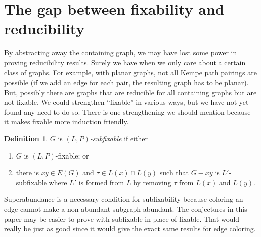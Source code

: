 \documentclass[12pt]{article}
\theoremstyle{plain}
\theoremstyle{definition}
\newtheorem{defn}{Definition}
\theoremstyle{remark}
\begin{document}

%
\section{The gap between fixability and reducibility}
By abstracting away the containing graph, we may have lost some power in proving reducibility results. Surely we have when we only care about a certain class of graphs. For example, with planar graphs, not all Kempe path pairings are possible (if we add an edge for each pair, the resulting graph has to be planar).  But, possibly there are graphs that are reducible for all containing graphs but are not fixable.  We could strengthen ``fixable'' in various ways, but we have not yet found any need to do so.  There is one strengthening we should mention because it makes fixable more induction friendly.  

\begin{defn}
$G$ is \emph{$(L, P)$-subfixable} if either
\begin{enumerate}
\item[(1)] $G$ is $(L, P)$-fixable; or
\item[(2)] there is $xy \in E(G)$ and $\tau \in L(x) \cap L(y)$ such that $G-xy$ is $L'$-subfixable where $L'$ is formed from $L$ by removing $\tau$ from $L(x)$ and $L(y)$.
\end{enumerate}
\end{defn}

Superabundance is a necessary condition for subfixability because coloring an edge cannot make a non-abundant subgraph abundant.  The conjectures in this paper may be easier to prove with subfixable in place of fixable.  That would really be just as good since it would give the exact same results for edge coloring.



\end{document}
